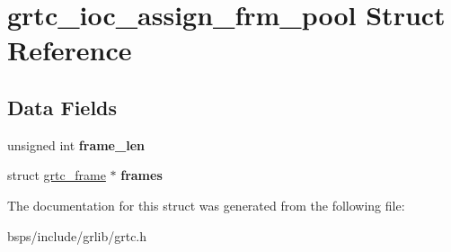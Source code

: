 \hypertarget{structgrtc__ioc__assign__frm__pool}{}\section{grtc\+\_\+ioc\+\_\+assign\+\_\+frm\+\_\+pool Struct Reference}
\label{structgrtc__ioc__assign__frm__pool}
\subsection*{Data Fields}
\begin{DoxyCompactItemize}
\item 
\mbox{\label{structgrtc__ioc__assign__frm__pool_a245762332a92b0b1b294c0bc3c978738}} 
unsigned int {\bfseries frame\+\_\+len}
\item 
\mbox{\label{structgrtc__ioc__assign__frm__pool_ad33d151dabfbdbf75450773c0c8e417e}} 
struct \mbox{\hyperlink{structgrtc__frame}{grtc\+\_\+frame}} $\ast$ {\bfseries frames}
\end{DoxyCompactItemize}


The documentation for this struct was generated from the following file\+:\begin{DoxyCompactItemize}
\item 
bsps/include/grlib/grtc.\+h\end{DoxyCompactItemize}
